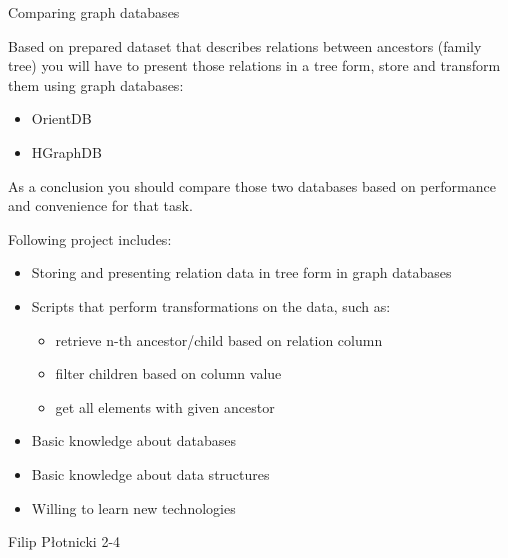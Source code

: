 \begin{project}
{Comparing graph databases}
{
Based on prepared dataset that describes relations between ancestors (family tree) you will have to present those relations in a tree form, store and transform them using graph databases:
\begin{itemize}
	\item OrientDB
	\item HGraphDB
\end{itemize}
As a conclusion you should compare those two databases based on performance and convenience for that task.
}
{
Following project includes:
\begin{itemize}
	\item Storing and presenting relation data in tree form in graph databases
	\item Scripts that perform transformations on the data, such as:
		\begin{itemize}
			\item retrieve n-th ancestor/child based on relation column
			\item filter children based on column value
			\item get all elements with given ancestor
		\end{itemize}
\end{itemize}
}
{
\begin{itemize}
	\item Basic knowledge about databases
	\item Basic knowledge about data structures
	\item Willing to learn new technologies
\end{itemize}
}
{Filip Płotnicki}
{2-4}
\end{project}
